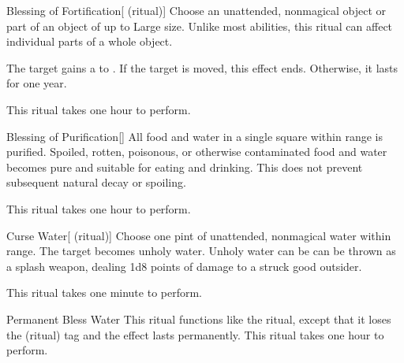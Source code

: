 \lowercase{\hypertarget{spell:Blessing of Fortification}{}}\label{spell:Blessing of Fortification}
\begin{ability}[\nth{1}]{\hypertarget{spell:Blessing of Fortification}{Blessing of Fortification}}[ (ritual)]
Choose an unattended, nonmagical object or part of an object of up to Large size.
Unlike most abilities, this ritual can affect individual parts of a whole object.

The target gains a   to .
If the target is moved, this effect ends.
Otherwise, it lasts for one year.

This ritual takes one hour to perform.
\end{ability}
\vspace{0.25em}



\lowercase{\hypertarget{spell:Blessing of Purification}{}}\label{spell:Blessing of Purification}
\begin{ability}[\nth{1}]{\hypertarget{spell:Blessing of Purification}{Blessing of Purification}}[]
All food and water in a single square within \rngclose range is purified.
Spoiled, rotten, poisonous, or otherwise contaminated food and water becomes pure and suitable for eating and drinking.
This does not prevent subsequent natural decay or spoiling.

This ritual takes one hour to perform.
\end{ability}
\vspace{0.25em}



\lowercase{\hypertarget{spell:Curse Water}{}}\label{spell:Curse Water}
\begin{ability}[\nth{1}]{\hypertarget{spell:Curse Water}{Curse Water}}[ (ritual)]
Choose one pint of unattended, nonmagical water within \rngclose range.
The target becomes unholy water.
Unholy water can be can be thrown as a splash weapon, dealing 1d8 points of damage to a struck good outsider.

This ritual takes one minute to perform.
\end{ability}
\vspace{0.25em}



\lowercase{\hypertarget{spell:Permanent Bless Water}{}}\label{spell:Permanent Bless Water}
\begin{ability}[\nth{2}]{\hypertarget{spell:Permanent Bless Water}{Permanent Bless Water}}
This ritual functions like the  ritual, except that it loses the  (ritual) tag and the effect lasts permanently.
This ritual takes one hour to perform.
\end{ability}
\vspace{0.25em}



